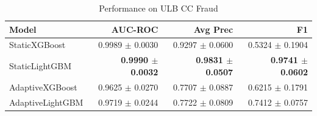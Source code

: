 \begin{table}[ht]
\centering
\caption{Performance on ULB CC Fraud}
\label{tab:results_ccfraud}
\begin{tabular}{lrrr}
\hline
Model & AUC-ROC & Avg Prec & F1 \\
\hline
StaticXGBoost & 0.9989 $\pm$ 0.0030 & 0.9297 $\pm$ 0.0600 & 0.5324 $\pm$ 0.1904 \\
StaticLightGBM & \textbf{0.9990 $\pm$ 0.0032} & \textbf{0.9831 $\pm$ 0.0507} & \textbf{0.9741 $\pm$ 0.0602} \\
AdaptiveXGBoost & 0.9625 $\pm$ 0.0270 & 0.7707 $\pm$ 0.0887 & 0.6215 $\pm$ 0.1791 \\
AdaptiveLightGBM & 0.9719 $\pm$ 0.0244 & 0.7722 $\pm$ 0.0809 & 0.7412 $\pm$ 0.0757 \\
\hline
\end{tabular}
\end{table}
